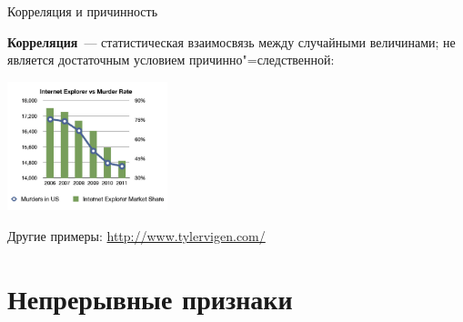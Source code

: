 \documentclass[9pt,pdf,utf8,hyperref={unicode},aspectratio=169]{beamer}
\begin{document}
\begin{frame}{Корреляция и причинность}
\begin{center}
		\end{center}
		\textbf{Корреляция}~--- статистическая взаимосвязь между случайными величинами; не является достаточным условием причинно"=следственной:
		\begin{center}
			\includegraphics[width=0.35\textwidth]{ievsmurder.png}
		\end{center}
		Другие примеры: \url{http://www.tylervigen.com/}
\end{frame}


\section{Непрерывные признаки}
\end{document}
